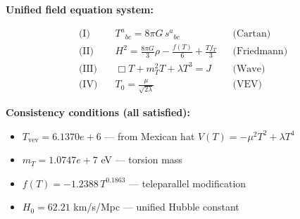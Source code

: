 
\textbf{Unified field equation system:}

\begin{align}
  \text{(I)} \quad & T^a{}_{bc} = 8\pi G \, s^a{}_{bc} && \text{(Cartan)} \\
  \text{(II)} \quad & H^2 = \frac{8\pi G}{3}\rho - \frac{f(T)}{6} + \frac{Tf_T}{3} && \text{(Friedmann)} \\
  \text{(III)} \quad & \Box T + m_T^2 T + \lambda T^3 = J && \text{(Wave)} \\
  \text{(IV)} \quad & T_0 = \frac{\mu}{\sqrt{2\lambda}} && \text{(VEV)}
\end{align}

\textbf{Consistency conditions (all satisfied):}
\begin{itemize}
  \item $T_{\text{vev}} = 6.1370e+6$ — from Mexican hat $V(T) = -\mu^2 T^2 + \lambda T^4$
  \item $m_T = 1.0747e+7$ eV — torsion mass
  \item $f(T) = -1.2388 \, T^{0.1863}$ — teleparallel modification
  \item $H_0 = 62.21$ km/s/Mpc — unified Hubble constant
\end{itemize}